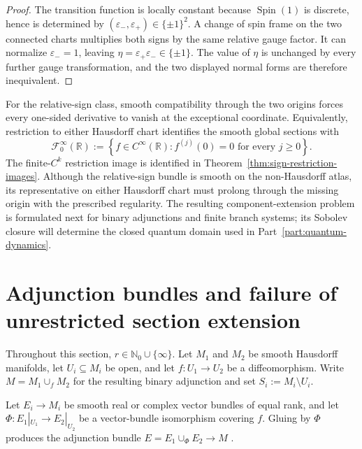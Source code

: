 \documentclass[11pt]{article}
\theoremstyle{plain}
\theoremstyle{definition}
\begin{document}
\begin{proof}
The transition function is locally constant because
\(\operatorname{Spin}(1)\) is discrete, hence is determined by
\((\varepsilon_-,\varepsilon_+)\in\{\pm1\}^2\). A change of spin frame on
the two connected charts multiplies both signs by the same relative gauge
factor. It can normalize \(\varepsilon_-=1\), leaving
\(\eta=\varepsilon_+\varepsilon_-\in\{\pm1\}\). The value of \(\eta\) is
unchanged by every further gauge transformation, and the two displayed
normal forms are therefore inequivalent.
\end{proof}

For the relative-sign class, smooth compatibility through the two origins
forces every one-sided derivative to vanish at the exceptional coordinate.
Equivalently, restriction to either Hausdorff chart identifies the smooth
global sections with
\[
  \mathcal F^\infty_0(\mathbb R)
  :=
  \left\{
    f\in C^\infty(\mathbb R):
    f^{(j)}(0)=0
    \text{ for every }j\ge0
  \right\}.
\]
The finite-\(C^k\) restriction image is identified in
Theorem~\ref{thm:sign-restriction-images}. Although the relative-sign bundle
is smooth on the non-Hausdorff atlas, its representative on either Hausdorff
chart must prolong through the missing origin with the prescribed regularity.
The resulting component-extension problem is formulated next for binary
adjunctions and finite branch systems; its Sobolev closure will determine the
closed quantum domain used in Part~\ref{part:quantum-dynamics}.

\section{Adjunction bundles and failure of unrestricted section extension}
\label{sec:extension-failure}

Throughout this section,
\(r\in\mathbb N_0\cup\{\infty\}\).
Let \(M_1\) and \(M_2\) be smooth Hausdorff manifolds, let \(U_i\subseteq M_i\) be open, and let \(f:U_1\longrightarrow U_2\) be a diffeomorphism. Write \(M=M_1\cup_f M_2\) for the resulting binary adjunction and set
\(S_i:=M_i\setminus U_i\).

Let \(E_i\longrightarrow M_i\) be smooth real or complex vector bundles of equal rank, and let \(\Phi:E_1|_{U_1}\longrightarrow E_2|_{U_2}\) be a vector-bundle isomorphism covering \(f\). Gluing by \(\Phi\)
produces the adjunction bundle
\(E=E_1\cup_\Phi E_2\longrightarrow M\)
\citep{OConnell2024Bundles}.
\end{document}
